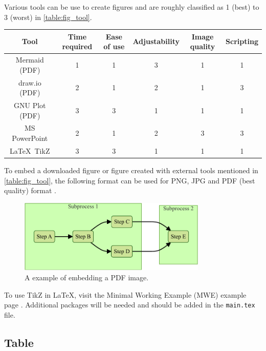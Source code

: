 Various tools can be use to create figures and are roughly classified as 1 (best) to 3 (worst) in \autoref{table:fig_tool}.

\begin{center}
    \label{table:fig_tool}
    \begin{tabular}{ c c c c c c }
        \toprule
        Tool & Time required & Ease of use & Adjustability & Image quality & Scripting \\
        \midrule
        Mermaid (PDF) \cite{mermaid} & 1 & 1 & 3 & 1 & 1 \\
        draw.io (PDF) \cite{drawio} & 2 & 1 & 2 & 1 & 3 \\
        GNU Plot (PDF) \cite{gnuplot} & 3 & 3 & 1 & 1 & 1 \\
        MS PowerPoint & 2 & 1 & 2 & 3 & 3 \\
        \LaTeX\ TikZ \cite{tikz} & 3 & 3 & 1 & 1 & 1 \\
        \bottomrule
    \end{tabular}
\end{center}

To embed a downloaded figure or figure created with external tools mentioned in \autoref{table:fig_tool}, the following format can be used for PNG, JPG and PDF (best quality) format \cite{inserting_img}.

\begin{figure}[H]
    \centering
    \includegraphics[width=0.8\textwidth]{../figure/mermaid_out/flowchart.pdf}
    \caption{A example of embedding a PDF image.}
    \label{fig:embed_pdf}
\end{figure}

To use TikZ in \LaTeX, visit the Minimal Working Example (MWE) example page \cite{tikz_example}. Additional packages will be needed and should be added in the \texttt{main.tex} file.

\subsection{Table}

